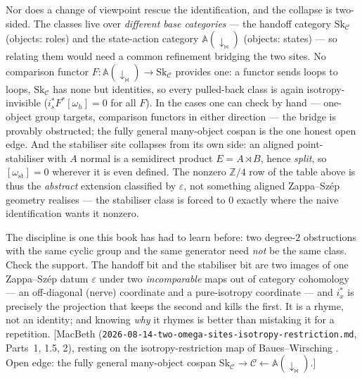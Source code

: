 \documentclass[11pt,a4paper]{book}
\theoremstyle{plain}
\theoremstyle{definition}
\theoremstyle{remark}
\newcommand{\prov}[1]{\hfill\textsf{\footnotesize[#1]}}
\begin{document}
\begin{teachbox}
Nor does a change of viewpoint rescue the identification, and the collapse is two-sided.
The classes live over \emph{different base categories} --- the handoff category
$\mathrm{Sk}_{\mathcal C}$ (objects: roles) and the state-action category
$\mathbb A(\downarrow_{\bowtie})$ (objects: states) --- so relating them would need a common
refinement bridging the two sites. No comparison functor
$F\colon\mathbb A(\downarrow_{\bowtie})\to\mathrm{Sk}_{\mathcal C}$ provides one: a functor
sends loops to loops, $\mathrm{Sk}_{\mathcal C}$ has none but identities, so every
pulled-back class is again isotropy-invisible ($i_{s}^{*}F^{*}[\omega_{h}]=0$ for all $F$).
In the cases one can check by hand --- one-object group targets, comparison functors in
either direction --- the bridge is provably obstructed; the fully general many-object
cospan is the one honest open edge. And the stabiliser site collapses from its own side:
an aligned point-stabiliser with $A$ normal is a semidirect product $E=A\rtimes B$, hence
\emph{split}, so $[\omega_{\mathrm{st}}]=0$ wherever it is even defined. The nonzero
$\mathbb Z/4$ row of the table above is thus the \emph{abstract} extension classified by
$\varepsilon$, not something aligned Zappa--Sz\'ep geometry realises --- the stabiliser
class is forced to $0$ exactly where the naive identification wants it nonzero.

The discipline is one this book has had to learn before: two degree-$2$ obstructions with
the same cyclic group and the same generator need \emph{not} be the same class. Check the
support. The handoff bit and the stabiliser bit are two images of one Zappa--Sz\'ep datum
$\varepsilon$ under two \emph{incomparable} maps out of category cohomology --- an
off-diagonal (nerve) coordinate and a pure-isotropy coordinate --- and $i_{x}^{*}$ is
precisely the projection that keeps the second and kills the first. It is a rhyme, not an
identity; and knowing \emph{why} it rhymes is better than mistaking it for a repetition.
\prov{MacBeth (\texttt{2026-08-14-two-omega-sites-isotropy-restriction.md}, Parts~1, 1.5,
2), resting on the isotropy-restriction map of Baues--Wirsching \cite{BW85}. Open edge: the
fully general many-object cospan $\mathrm{Sk}_{\mathcal C}\to\mathcal C\leftarrow
\mathbb A(\downarrow_{\bowtie})$.}
\end{teachbox}
\end{document}
